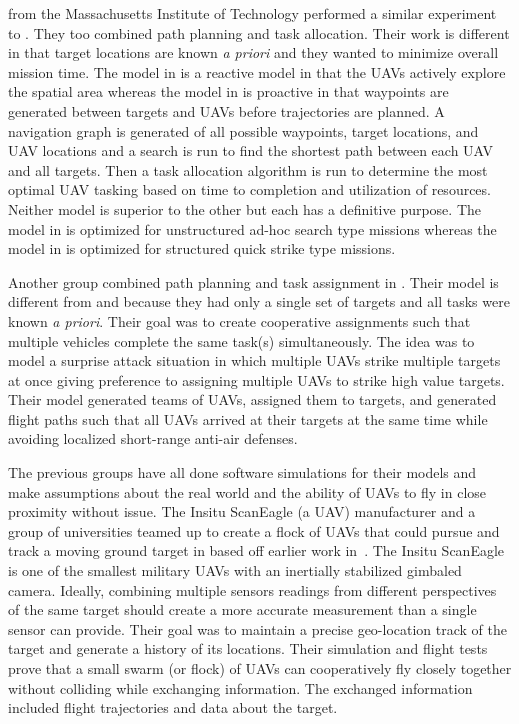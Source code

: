 \citet{bellingham} from the Massachusetts Institute of Technology performed a similar experiment to \citet{jin}.   They too combined path planning and task allocation.  Their work is different in that target locations are known \textit{a priori} and they wanted to minimize overall mission time.  The model in \citet{jin} is a reactive model in that the UAVs actively explore the spatial area whereas the model in \citet{bellingham} is proactive in that waypoints are generated between targets and UAVs before trajectories are planned.  A navigation graph is generated of all possible waypoints, target locations, and UAV locations and a search is run to find the shortest path between each UAV and all targets.  Then a task allocation algorithm is run to determine the most optimal UAV tasking based on time to completion and utilization of resources.  Neither model is superior to the other but each has a definitive purpose.  The model in \citet{jin} is optimized for unstructured ad-hoc search type missions whereas the model in \citet{bellingham} is optimized for structured quick strike type missions.

Another group combined path planning and task assignment in \citet{beard}.  Their model is different from \citet{jin} and \citet{bellingham} because they had only a single set of targets and all tasks were known \textit{a priori}.  Their goal was to create cooperative assignments such that multiple vehicles complete the same task(s) simultaneously.  The idea was to model a surprise attack situation in which multiple UAVs strike multiple targets at once giving preference to assigning multiple UAVs to strike high value targets.  Their model generated teams of UAVs, assigned them to targets, and generated flight paths such that all UAVs arrived at their targets at the same time while avoiding localized short-range anti-air defenses.

The previous groups have all done software simulations for their models and make assumptions about the real world and the ability of UAVs to fly in close proximity without issue.  The Insitu ScanEagle (a UAV) manufacturer and a group of universities teamed up to create a flock of UAVs that could pursue and track a moving ground target in \citet{wheeler} based off earlier work in~\citet{wise_rolf}.  The Insitu ScanEagle is one of the smallest military UAVs with an inertially stabilized gimbaled camera.  Ideally, combining multiple sensors readings from different perspectives of the same target should create a more accurate measurement than a single sensor can provide.  Their goal was to maintain a precise geo-location track of the target and generate a history of its locations.  Their simulation and flight tests prove that a small swarm (or flock) of UAVs can cooperatively fly closely together without colliding while exchanging information.  The exchanged information included flight trajectories and data about the target. 

